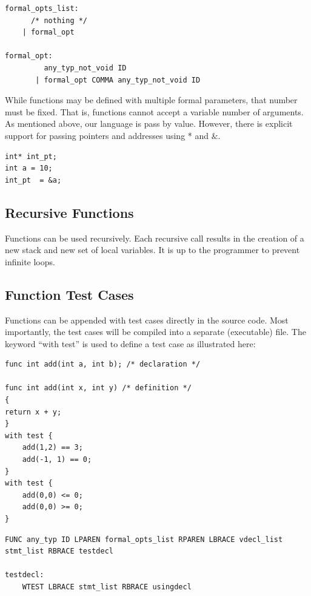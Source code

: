 \documentclass{article}
\begin{document}
\begin{Verbatim}[frame=single]
formal_opts_list:
	  /* nothing */ 
	| formal_opt 

formal_opt:
	     any_typ_not_void ID 		
	   | formal_opt COMMA any_typ_not_void ID 	
\end{Verbatim}


While functions may be defined with multiple formal parameters, that number must be fixed. That is, functions cannot accept a variable number of arguments. As mentioned above, our language is pass by value. However, there is explicit support for passing pointers and addresses using * and $\&$. 

\begin{lstlisting}
int* int_pt;
int a = 10;
int_pt  = &a;
\end{lstlisting}


\subsection{Recursive Functions}

Functions can be used recursively. Each recursive call results in the creation of a new stack and new set of local variables. It is up to the programmer to prevent infinite loops. 

\subsection{Function Test Cases}
Functions can be appended with test cases directly in the source code. Most importantly, the test cases will be compiled into a separate (executable) file. The keyword ``with test'' is used to define a test case as illustrated here:

\begin{lstlisting}
func int add(int a, int b); /* declaration */

func int add(int x, int y) /* definition */
{
return x + y;
}
with test {
	add(1,2) == 3;
	add(-1, 1) == 0;
}
with test {
	add(0,0) <= 0;
	add(0,0) >= 0; 
}

\end{lstlisting}

\begin{Verbatim}[frame=single]
FUNC any_typ ID LPAREN formal_opts_list RPAREN LBRACE vdecl_list stmt_list RBRACE testdecl 

testdecl:
	WTEST LBRACE stmt_list RBRACE usingdecl
\end{Verbatim}
\end{document}
